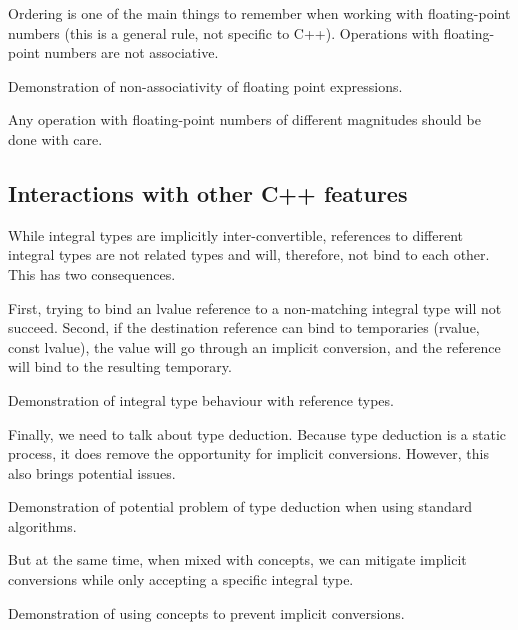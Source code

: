Ordering is one of the main things to remember when working with floating-point numbers (this is a general rule, not specific to C++). Operations with floating-point numbers are not associative.

\begin{codebox}[]{\href{https://compiler-explorer.com/z/q3c43h7hj}{\ExternalLink}}
\footnotesize Demonstration of non-associativity of floating point expressions.
\tcblower
{}
\end{codebox}

Any operation with floating-point numbers of different magnitudes should be done with care.

\subsection{Interactions with other C++ features}

While integral types are implicitly inter-convertible, references to different integral types are not related types and will, therefore, not bind to each other. This has two consequences.

First, trying to bind an lvalue reference to a non-matching integral type will not succeed. Second, if the destination reference can bind to temporaries (rvalue, const lvalue), the value will go through an implicit conversion, and the reference will bind to the resulting temporary.

\begin{codebox}[]{\href{https://compiler-explorer.com/z/71b73eo8P}{\ExternalLink}}
\footnotesize Demonstration of integral type behaviour with reference types.
\tcblower
{}
\end{codebox}

Finally, we need to talk about type deduction. Because type deduction is a static process, it does remove the opportunity for implicit conversions. However, this also brings potential issues.

\begin{codebox}[]{\href{https://compiler-explorer.com/z/f131811x4}{\ExternalLink}}
\footnotesize Demonstration of potential problem of type deduction when using standard algorithms.
\tcblower
{}
\end{codebox}

But at the same time, when mixed with concepts, we can mitigate implicit conversions while only accepting a specific integral type.

\begin{codebox}[breakable]{\href{https://compiler-explorer.com/z/qcWPPhTT6}{\ExternalLink}}
\footnotesize Demonstration of using concepts to prevent implicit conversions.
\tcblower
{}
\end{codebox}